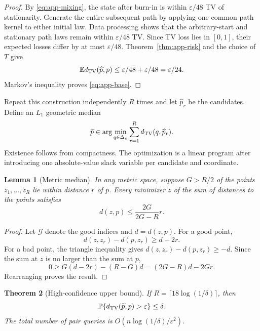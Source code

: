 \documentclass{article}
\newtheorem{theorem}{Theorem}
\newtheorem{lemma}[theorem]{Lemma}
\newcommand{\E}{\mathbb E}
\newcommand{\Prb}{\mathbb P}
\newcommand{\TV}{d_{\rm TV}}
\begin{document}
\begin{proof}
By \eqref{eq:app-mixing}, the state after burn-in is within
$\varepsilon/48$ TV of stationarity. Generate the entire subsequent path by
applying one common path kernel to either initial law. Data processing shows
that the arbitrary-start and stationary path laws remain within
$\varepsilon/48$ TV. Since TV loss lies in $[0,1]$, their expected losses
differ by at most $\varepsilon/48$. Theorem~\ref{thm:app-risk} and the choice
of $T$ give
\[
 \E\TV(\widehat p,p)\le\varepsilon/48+\varepsilon/48
 =\varepsilon/24.
\]
Markov's inequality proves \eqref{eq:app-base}.
\end{proof}

Repeat this construction independently $R$ times and let $\widehat p_r$ be
the candidates. Define an $L_1$ geometric median
\begin{equation}
 \widetilde p\in\arg\min_{q\in\Delta_n}
 \sum_{r=1}^R\TV(q,\widehat p_r).
 \label{eq:app-median}
\end{equation}
Existence follows from compactness. The optimization is a linear program
after introducing one absolute-value slack variable per candidate and
coordinate.

\begin{lemma}[Metric median]
\label{lem:app-median}
In any metric space, suppose $G>R/2$ of the points $z_1,\ldots,z_R$ lie
within distance $r$ of $p$. Every minimizer $z$ of the sum of distances to
the points satisfies
\begin{equation}
 d(z,p)\le\frac{2G}{2G-R}r.
 \label{eq:app-median-bound}
\end{equation}
\end{lemma}

\begin{proof}
Let $\mathcal G$ denote the good indices and $d=d(z,p)$. For a good point,
\[
 d(z,z_r)-d(p,z_r)\ge d-2r.
\]
For a bad point, the triangle inequality gives
$d(z,z_r)-d(p,z_r)\ge-d$. Since the sum at $z$ is no larger than the sum at
$p$,
\[
 0\ge G(d-2r)-(R-G)d=(2G-R)d-2Gr.
\]
Rearranging proves the result.
\end{proof}

\begin{theorem}[High-confidence upper bound]
\label{thm:app-upper}
If $R=\lceil18\log(1/\delta)\rceil$, then
\begin{equation}
 \Prb\{\TV(\widetilde p,p)>\varepsilon\}\le\delta.
 \label{eq:app-upper}
\end{equation}
The total number of pair queries is
$O(n\log(1/\delta)/\varepsilon^2)$.
\end{theorem}
\end{document}
